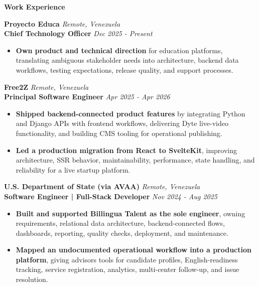 \documentclass[10pt]{article}
\begin{document}
\vspace{3pt}
\begin{center}
    \textbf{Work Experience}
\end{center}
\vspace{-7pt}

\textbf{Proyecto Educa} \hfill \textit{Remote, Venezuela} \\
\textbf{Chief Technology Officer} \hfill \textit{Dec 2025 - Present}
\begin{itemize}
    \item \textbf{Own product and technical direction} for education platforms, translating ambiguous stakeholder needs into architecture, backend data workflows, testing expectations, release quality, and support processes.
\end{itemize}

\vspace{2pt}
\textbf{Free2Z} \hfill \textit{Remote, Venezuela} \\
\textbf{Principal Software Engineer} \hfill \textit{Apr 2025 - Apr 2026}
\begin{itemize}
    \item \textbf{Shipped backend-connected product features} by integrating Python and Django APIs with frontend workflows, delivering Dyte live-video functionality, and building CMS tooling for operational publishing.
    \item \textbf{Led a production migration from React to SvelteKit}, improving architecture, SSR behavior, maintainability, performance, state handling, and reliability for a live startup platform.
\end{itemize}

\vspace{2pt}
\textbf{U.S. Department of State (via AVAA)} \hfill \textit{Remote, Venezuela} \\
\textbf{Software Engineer | Full-Stack Developer} \hfill \textit{Nov 2024 - Aug 2025}
\begin{itemize}
    \item \textbf{Built and supported Billingua Talent as the sole engineer}, owning requirements, relational data architecture, backend-connected flows, dashboards, reporting, quality checks, deployment, and maintenance.
    \item \textbf{Mapped an undocumented operational workflow into a production platform}, giving advisors tools for candidate profiles, English-readiness tracking, service registration, analytics, multi-center follow-up, and issue resolution.
\end{itemize}
\end{document}
